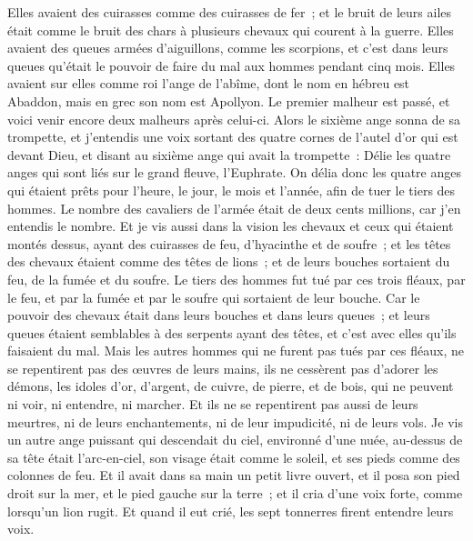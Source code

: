 \begin{multicols}{2}
Elles avaient des cuirasses comme des cuirasses de fer~; et le bruit de leurs ailes était comme le bruit des chars à plusieurs chevaux qui courent à la guerre.
Elles avaient des queues armées d'aiguillons, comme les scorpions, et c'est dans leurs queues qu'était le pouvoir de faire du mal aux hommes pendant cinq mois.
Elles avaient sur elles comme roi l'ange de l'abîme, dont le nom en hébreu est Abaddon, mais en grec son nom est Apollyon.
Le premier malheur est passé, et voici venir encore deux malheurs après celui-ci.
Alors le sixième ange sonna de sa trompette, et j'entendis une voix sortant des quatre cornes de l'autel d'or qui est devant Dieu,
et disant au sixième ange qui avait la trompette~: Délie les quatre anges qui sont liés sur le grand fleuve, l'Euphrate.
On délia donc les quatre anges qui étaient prêts pour l'heure, le jour, le mois et l'année, afin de tuer le tiers des hommes.
Le nombre des cavaliers de l'armée était de deux cents millions, car j'en entendis le nombre.
Et je vis aussi dans la vision les chevaux et ceux qui étaient montés dessus, ayant des cuirasses de feu, d'hyacinthe et de soufre~; et les têtes des chevaux étaient comme des têtes de lions~; et de leurs bouches sortaient du feu, de la fumée et du soufre.
Le tiers des hommes fut tué par ces trois fléaux, par le feu, et par la fumée et par le soufre qui sortaient de leur bouche.
Car le pouvoir des chevaux était dans leurs bouches et dans leurs queues~; et leurs queues étaient semblables à des serpents ayant des têtes, et c'est avec elles qu'ils faisaient du mal.
Mais les autres hommes qui ne furent pas tués par ces fléaux, ne se repentirent pas des œuvres de leurs mains, ils ne cessèrent pas d'adorer les démons, les idoles d'or, d'argent, de cuivre, de pierre, et de bois, qui ne peuvent ni voir, ni entendre, ni marcher.
Et ils ne se repentirent pas aussi de leurs meurtres, ni de leurs enchantements, ni de leur impudicité, ni de leurs vols.
\VerseOne{}Je vis un autre ange puissant qui descendait du ciel, environné d'une nuée, au-dessus de sa tête était l'arc-en-ciel, son visage était comme le soleil, et ses pieds comme des colonnes de feu.
Et il avait dans sa main un petit livre ouvert, et il posa son pied droit sur la mer, et le pied gauche sur la terre~;
et il cria d'une voix forte, comme lorsqu'un lion rugit. Et quand il eut crié, les sept tonnerres firent entendre leurs voix.

\end{multicols}
